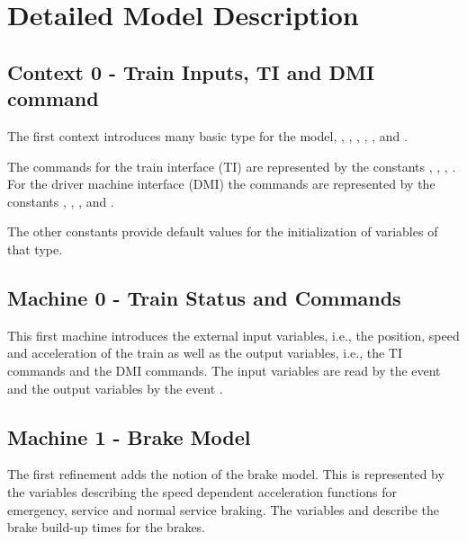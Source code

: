 \documentclass{template/openetcs_article}
\begin{document}
\section{Detailed Model Description}
\label{sec:deta-model-descr}


\subsection{Context 0 - Train Inputs, TI and DMI command}
\label{sec:context-0-entities}

The first context introduces many basic type for the model,
, , ,
, ,  and
.

The commands for the train interface (TI) are represented by the constants
, , ,
. For the driver machine interface (DMI) the commands are
represented by the constants , ,
,  and .

The other constants provide default values for the initialization of variables
of that type.

{\footnotesize

}

\subsection{Machine 0 - Train Status and Commands}
\label{sec:machine-0-train}

This first machine introduces the external input variables, i.e., the position,
speed and acceleration of the train as well as the output variables, i.e., the
TI commands and the DMI commands. The input variables are read by the event
 and the output variables by the event
.

{\footnotesize

}

\subsection{Machine 1 - Brake Model}
\label{sec:machine-1-brake}

The first refinement adds the notion of the brake model. This is represented by
the variables describing the speed dependent acceleration functions for
emergency, service and normal service braking. The variables
 and  describe the brake
build-up times for the brakes.
\end{document}
